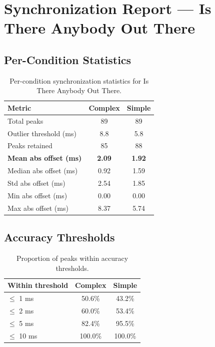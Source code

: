 
\section*{Synchronization Report --- Is There Anybody Out There}

\subsection*{Per-Condition Statistics}

\begin{table}[h!]
\centering
\begin{tabular}{|l|c|c|}
\hline
Metric & Complex & Simple \\
\hline
Total peaks & 89 & 89 \\
Outlier threshold (ms) & 8.8 & 5.8 \\
Peaks retained & 85 & 88 \\
\textbf{Mean abs offset (ms)} & \textbf{2.09} & \textbf{1.92} \\
Median abs offset (ms) & 0.92 & 1.59 \\
Std abs offset (ms) & 2.54 & 1.85 \\
Min abs offset (ms) & 0.00 & 0.00 \\
Max abs offset (ms) & 8.37 & 5.74 \\
\hline
\end{tabular}
\caption{Per-condition synchronization statistics for Is There Anybody Out There.}
\label{tab:sync_stats}
\end{table}

\subsection*{Accuracy Thresholds}

\begin{table}[h!]
\centering
\begin{tabular}{|l|c|c|}
\hline
Within threshold & Complex & Simple \\
\hline
$\leq$ 1 ms & 50.6\% & 43.2\% \\
$\leq$ 2 ms & 60.0\% & 53.4\% \\
$\leq$ 5 ms & 82.4\% & 95.5\% \\
$\leq$ 10 ms & 100.0\% & 100.0\% \\
\hline
\end{tabular}
\caption{Proportion of peaks within accuracy thresholds.}
\label{tab:sync_accuracy}
\end{table}

